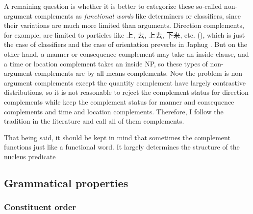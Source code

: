 \documentclass[../main.tex]{subfiles}
\begin{document}
A remaining question is whether it is better 
to categorize these so-called non-argument complements as \emph{functional words} like determiners or classifiers,
since their variations are much more limited than arguments.
Direction complements, for example, are limited to particles like 
上, 去, 上去, 下来, etc. (),
which is just the case of classifiers %
and the case of orientation preverbs in Japhug \citep[]{jacques2021grammar}. 
But on the other hand, a manner or consequence complement may take an inside clause, %
and a time or location complement takes an inside NP, %
so these types of non-argument complements are by all means complements.
Now the problem is non-argument complements except the quantity complement 
have largely contrastive distributions,
so it is not reasonable to reject the complement status for direction complements 
while keep the complement status for manner and consequence complements and time and location complements.
Therefore, I follow the tradition in the literature and call all of them complements.

That being said, it should be kept in mind that sometimes the complement functions just like a functional word.
It largely determines the structure of the nucleus predicate %

\subsection{Grammatical properties}

\subsubsection{Constituent order}
\end{document}
